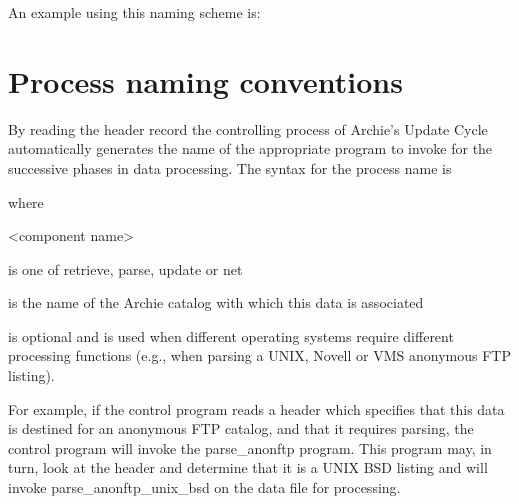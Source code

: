 \noindent An example using this naming scheme is:








%
%
%
\section{Process naming conventions}

By reading the header record the controlling process of Archie's Update Cycle
automatically generates the name of the appropriate program to invoke for the
successive phases in data processing. The syntax for the process name is


\noindent where

\begin{TTentry}{<component name>}
\item[<component name>] is one of retrieve, parse, update or net

\item[<dbame>]
is the name of the Archie catalog with which this data is associated

\item[<os type>]
is optional and is used when different operating systems require
different processing functions (e.g., when parsing a UNIX, Novell or
VMS anonymous FTP listing).
\end{TTentry}


For example, if the control program reads a header which specifies that this
data is destined for an anonymous FTP catalog, and that it requires parsing,
the control program will invoke the parse\_anonftp program. This program may,
in turn, look at the header and determine that it is a UNIX BSD listing and
will invoke parse\_anonftp\_unix\_bsd on the data file for processing.



